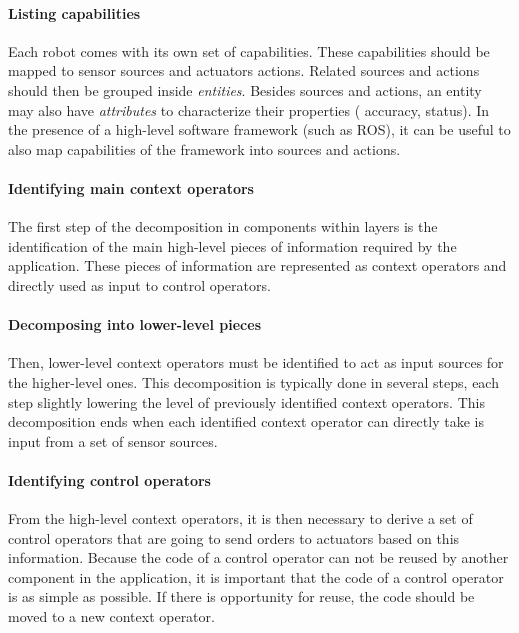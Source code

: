 \paragraph{Listing capabilities}
Each robot comes with its own set of capabilities. These capabilities
should be mapped to sensor sources and actuators actions. Related
sources and actions should then be grouped inside \emph{entities}.
Besides sources and actions, an entity may also have \emph{attributes}
to characterize their properties (\eg{} accuracy, status). In the
presence of a high-level software framework (such as ROS), it can be
useful to also map capabilities of the framework into sources and
actions.

\paragraph{Identifying main context operators}
The first step of the decomposition in components within layers is the
identification of the main high-level pieces of information required
by the application. These pieces of information are represented as
context operators and directly used as input to control operators.

\paragraph{Decomposing into lower-level pieces}
Then, lower-level context operators must be identified to act as input
sources for the higher-level ones. This decomposition is typically
done in several steps, each step slightly lowering the level of
previously identified context operators. This decomposition ends when
each identified context operator can directly take is input from a set
of sensor sources.

\paragraph{Identifying control operators}
From the high-level context operators, it is then necessary to derive
a set of control operators that are going to send orders to actuators
based on this information. Because the code of a control operator can
not be reused by another component in the application, it is important
that the code of a control operator is as simple as possible. If there
is opportunity for reuse, the code should be moved to a new context
operator.



